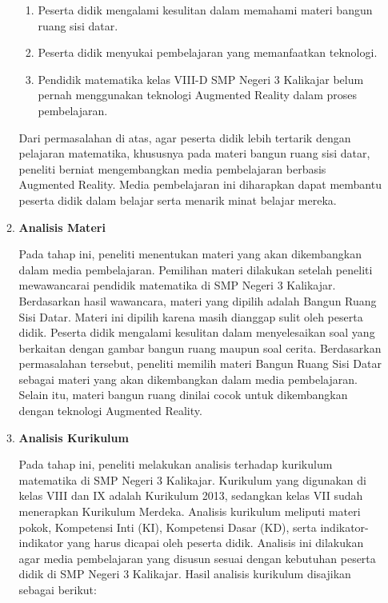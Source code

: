 \documentclass[12pt]{article}
\begin{document}
\begin{enumerate}[leftmargin=1cm, label=\arabic*.]
\begin{enumerate}[label=\textbf{\alph*.}]
\begin{enumerate}
            \item Peserta didik mengalami kesulitan dalam memahami materi bangun ruang sisi datar.
    
            \item Peserta didik menyukai pembelajaran yang memanfaatkan teknologi.
    
            \item Pendidik matematika kelas VIII-D SMP Negeri 3 Kalikajar belum pernah menggunakan teknologi Augmented Reality dalam proses pembelajaran.
        \end{enumerate}

        \hspace*{1cm}Dari permasalahan di atas, agar peserta didik lebih tertarik dengan pelajaran matematika, khususnya pada materi bangun ruang sisi datar, peneliti berniat mengembangkan media pembelajaran berbasis Augmented Reality. Media pembelajaran ini diharapkan dapat membantu peserta didik dalam belajar serta menarik minat belajar mereka.

        \item \textbf{Analisis Materi}
        
        \hspace*{1cm}Pada tahap ini, peneliti menentukan materi yang akan dikembangkan dalam media pembelajaran. Pemilihan materi dilakukan setelah peneliti mewawancarai pendidik matematika di SMP Negeri 3 Kalikajar. Berdasarkan hasil wawancara, materi yang dipilih adalah Bangun Ruang Sisi Datar. Materi ini dipilih karena masih dianggap sulit oleh peserta didik. Peserta didik mengalami kesulitan dalam menyelesaikan soal yang berkaitan dengan gambar bangun ruang maupun soal cerita. Berdasarkan permasalahan tersebut, peneliti memilih materi Bangun Ruang Sisi Datar sebagai materi yang akan dikembangkan dalam media pembelajaran. Selain itu, materi bangun ruang dinilai cocok untuk dikembangkan dengan teknologi Augmented Reality.

        \item \textbf{Analisis Kurikulum}
        
        \hspace*{1cm}Pada tahap ini, peneliti melakukan analisis terhadap kurikulum matematika di SMP Negeri 3 Kalikajar. Kurikulum yang digunakan di kelas VIII dan IX adalah Kurikulum 2013, sedangkan kelas VII sudah menerapkan Kurikulum Merdeka. Analisis kurikulum meliputi materi pokok, Kompetensi Inti (KI), Kompetensi Dasar (KD), serta indikator-indikator yang harus dicapai oleh peserta didik. Analisis ini dilakukan agar media pembelajaran yang disusun sesuai dengan kebutuhan peserta didik di SMP Negeri 3 Kalikajar. Hasil analisis kurikulum disajikan sebagai berikut:


\end{enumerate}
\end{enumerate}
\end{document}
